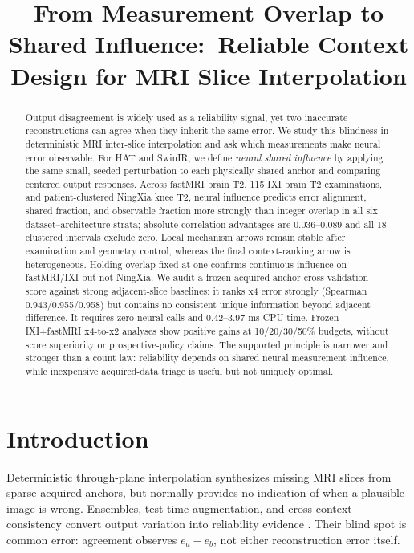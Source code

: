 \documentclass[10pt,twocolumn,letterpaper]{article}
\title{From Measurement Overlap to Shared Influence:\
Reliable Context Design for MRI Slice Interpolation}
\begin{document}
\maketitle

\begin{abstract}
Output disagreement is widely used as a reliability signal, yet two inaccurate reconstructions can agree when they inherit the same error. We study this blindness in deterministic MRI inter-slice interpolation and ask which measurements make neural error observable. For HAT and SwinIR, we define \emph{neural shared influence} by applying the same small, seeded perturbation to each physically shared anchor and comparing centered output responses. Across fastMRI brain T2, 115 IXI brain T2 examinations, and patient-clustered NingXia knee T2, neural influence predicts error alignment, shared fraction, and observable fraction more strongly than integer overlap in all six dataset--architecture strata; absolute-correlation advantages are 0.036--0.089 and all 18 clustered intervals exclude zero. Local mechanism arrows remain stable after examination and geometry control, whereas the final context-ranking arrow is heterogeneous. Holding overlap fixed at one confirms continuous influence on fastMRI/IXI but not NingXia. We audit a frozen acquired-anchor cross-validation score against strong adjacent-slice baselines: it ranks x4 error strongly (Spearman 0.943/0.955/0.958) but contains no consistent unique information beyond adjacent difference. It requires zero neural calls and 0.42--3.97 ms CPU time. Frozen IXI+fastMRI x4-to-x2 analyses show positive gains at 10/20/30/50\% budgets, without score superiority or prospective-policy claims. The supported principle is narrower and stronger than a count law: reliability depends on shared neural measurement influence, while inexpensive acquired-data triage is useful but not uniquely optimal.
\end{abstract}

\section{Introduction}
Deterministic through-plane interpolation synthesizes missing MRI slices from sparse acquired anchors, but normally provides no indication of when a plausible image is wrong. Ensembles, test-time augmentation, and cross-context consistency convert output variation into reliability evidence \cite{lakshminarayanan2017ensembles,gal2016dropout,edupuganti2021uncertainty}. Their blind spot is common error: agreement observes $e_a-e_b$, not either reconstruction error itself.
\end{document}
